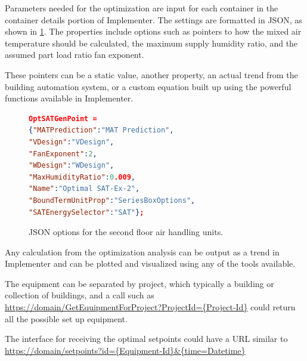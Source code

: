 Parameters needed for the optimization are input for each container in
the container details portion of Implementer. The settings are formatted
in JSON, as shown in \figref{} \ref{fig:JSONOptions}. The properties
include options such as pointers to how the mixed air temperature
should be calculated, the maximum supply humidity ratio, and the
assumed part load ratio fan exponent. 

These pointers can be a static value, another property, an actual
trend from the building automation system, or a custom equation built up
using the powerful functions available in Implementer.

\begin{figure}
\centering
\begin{lstlisting}[language=json]
OptSATGenPoint = 
{"MATPrediction":"MAT Prediction",
"VDesign":"VDesign",
"FanExponent":2,
"WDesign":"WDesign",
"MaxHumidityRatio":0.009,
"Name":"Optimal SAT-Ex-2",
"BoundTermUnitProp":"SeriesBoxOptions",
"SATEnergySelector":"SAT"};
\end{lstlisting}
\caption{JSON options for the second floor air handling units. }
\label{fig:JSONOptions}
\end{figure}

Any calculation from the optimization analysis can be output as a trend
in Implementer and can be plotted and visualized using any of the tools
available. 

The equipment can be separated by project, which typically a building or
collection of buildings, and a call such as
\url{https://domain/GetEquipmentForProject?ProjectId={Project-Id}}
could return all the possible set up equipment.

The interface for receiving the optimal setpoints could have a URL
similar to 
\url{https://domain/setpoints?id={Equipment-Id}\&{time=Datetime}}




